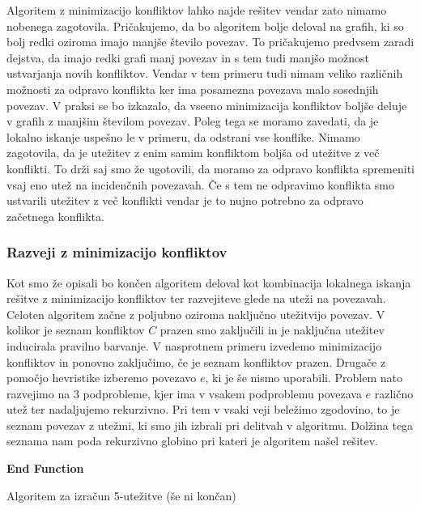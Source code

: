 \documentclass[12pt,a4paper,twoside]{article}
\theoremstyle{definition} %
\theoremstyle{plain} %
\numberwithin{equation}{section}  %
\begin{document}
Algoritem z minimizacijo konfliktov lahko najde rešitev vendar zato nimamo nobenega zagotovila. Pričakujemo, da bo algoritem bolje deloval na grafih, ki so bolj redki oziroma imajo manjše število povezav. To pričakujemo predvsem zaradi dejstva, da imajo redki grafi manj povezav in s tem tudi manjšo možnost ustvarjanja novih konfliktov. Vendar v tem primeru tudi nimam veliko različnih možnosti za odpravo konflikta ker ima posamezna povezava malo sosednjih povezav. V praksi se bo izkazalo, da vseeno minimizacija konfliktov boljše deluje v grafih z manjšim številom povezav. Poleg tega se moramo zavedati, da je lokalno iskanje uspešno le v primeru, da odstrani vse konflike. Nimamo zagotovila, da je utežitev z enim samim konfliktom boljša od utežitve z več konflikti. To drži saj smo že ugotovili, da moramo za odpravo konflikta spremeniti vsaj eno utež na incidenčnih povezavah. Če s tem ne odpravimo konflikta smo ustvarili utežitev z več konflikti vendar je to nujno potrebno za odpravo začetnega konflikta.

\subsubsection{Razveji z minimizacijo konfliktov}

Kot smo že opisali bo končen algoritem deloval kot kombinacija lokalnega iskanja rešitve z minimizacijo konfliktov ter razvejiteve glede na uteži na povezavah. Celoten algoritem začne z poljubno oziroma naključno utežitvijo povezav. V kolikor je seznam konfliktov $C$ prazen smo zaključili in je naključna utežitev inducirala pravilno barvanje. V nasprotnem primeru izvedemo minimizacijo konfliktov in ponovno zaključimo, če je seznam konfliktov prazen. Drugače z pomočjo hevristike izberemo povezavo $e$, ki je še nismo uporabili. Problem nato razvejimo na $3$ podprobleme, kjer ima v vsakem podproblemu povezava $e$ različno utež ter nadaljujemo rekurzivno. Pri tem v vsaki veji beležimo zgodovino, to je seznam povezav z utežmi, ki smo jih izbrali pri delitvah v algoritmu. Dolžina tega seznama nam poda rekurzivno globino pri kateri je algoritem našel rešitev.

\begin{algorithm}[H]

\textbf{End Function}



 
 \caption{Algoritem za izračun 5-utežitve (še ni končan)}
\end{algorithm}
\end{document}
